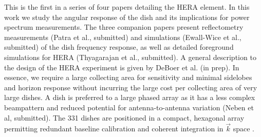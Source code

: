 \documentclass{emulateapj}
\begin{document}

This is the first in a series of four papers detailing the HERA element. In this work we study 
the angular response of the dish and its implications for power spectrum measurements. The three companion 
papers present reflectometry measurements (Patra et al., submitted) and simulations (Ewall-Wice et al., 
submitted) of the dish frequency response, as well as detailed 
foreground simulations for HERA (Thyagarajan et al., submitted). A general description to the design of the 
HERA experiment is given by DeBoer et al. (in prep). In essence, we 
require a large collecting area for
 sensitivity and minimal sidelobes and horizon response without incurring the large cost per collecting 
area of very large dishes. A dish is preferred to a large phased array as it has a less complex beampattern and reduced potential for antenna-to-antenna variation (Neben et al, submitted). The 331 dishes are positioned in a compact, hexagonal 
array permitting redundant baseline calibration and coherent integration in $
\vec{k}$ space \citep{zheng14,parsons12a}. 
\end{document}
